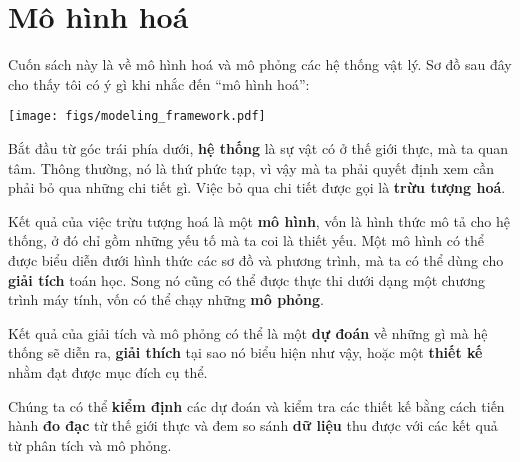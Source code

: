\documentclass[12pt, openany]{book}
\theoremstyle{exercise}
\begin{document}
\normalsize

\cleardoublepage

\begin{latexonly}


\cleardoublepage

\end{latexonly}

\mainmatter


\chapter{Mô hình hoá}
\label{chap01}

Cuốn sách này là về mô hình hoá và mô phỏng các hệ thống vật lý.
Sơ đồ sau đây cho thấy tôi có ý gì khi nhắc đến ``mô hình hoá'':


\vspace{0.2in}
\centerline{\texttt{[image: figs/modeling\_framework.pdf]}}

Bắt đầu từ góc trái phía dưới, {\bf hệ thống} là sự vật có ở thế giới thực, mà ta quan tâm. Thông thường, nó là thứ phức tạp, vì vậy mà ta phải quyết định xem cần phải bỏ qua những chi tiết gì. Việc bỏ qua chi tiết được gọi là {\bf trừu tượng hoá}.


Kết quả của việc trừu tượng hoá là một {\bf mô hình}, vốn là hình thức mô tả cho hệ thống, ở đó chỉ gồm những yếu tố mà ta coi là thiết yếu. Một mô hình có thể được biểu diễn đưới hình thức các sơ đồ và phương trình, mà ta có thể dùng cho {\bf giải tích} toán học. Song nó cũng có thể được thực thi dưới dạng một chương trình máy tính, vốn có thể chạy những {\bf mô phỏng}.


Kết quả của giải tích và mô phỏng có thể là một {\bf dự đoán} về những gì mà hệ thống sẽ diễn ra, {\bf giải thích} tại sao nó biểu hiện như vậy, hoặc một  {\bf thiết kế} nhằm đạt được mục đích cụ thể.


Chúng ta có thể {\bf kiểm định} các dự đoán và kiểm tra các thiết kế bằng cách tiến hành {\bf đo đạc} từ thế giới thực và đem so sánh {\bf dữ liệu} thu được với các kết quả từ phân tích và mô phỏng.
\end{document}
